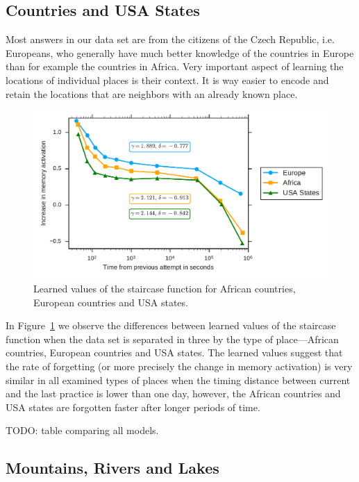 \subsection{Countries and USA States}

Most answers in our data set are from the citizens of the Czech Republic, i.e. Europeans, who generally have much better knowledge of the countries in Europe than for example the countries in Africa. Very important aspect of learning the locations of individual places is their context. It is way easier to encode and retain the locations that are neighbors with an already known place.

\begin{figure}[htbp]
  \centering
  \includegraphics[width=\textwidth]{img/africa-europe-usa-states}
  \caption{Learned values of the staircase function for African countries, European countries and USA states.}
  \label{fig:africa-europe-usa-states}
\end{figure}

In Figure~\ref{fig:africa-europe-usa-states} we observe the differences between learned values of the staircase function when the data set is separated in three by the type of place---African countries, European countries and USA states. The learned values suggest that the rate of forgetting (or more precisely the change in memory activation) is very similar in all examined types of places when the timing distance between current and the last practice is lower than one day, however, the African countries and USA states are forgotten faster after longer periods of time.

TODO: table comparing all models.

\subsection{Mountains, Rivers and Lakes}

